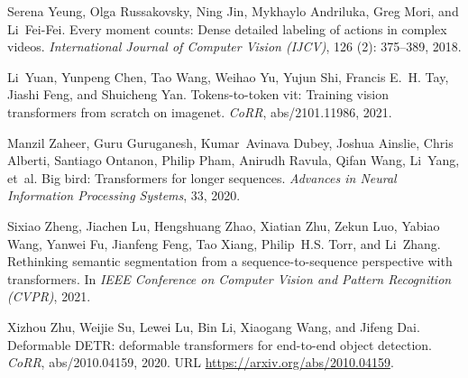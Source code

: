 \documentclass{bmvc2k}
\begin{document}
\begin{thebibliography}{53}
Serena Yeung, Olga Russakovsky, Ning Jin, Mykhaylo Andriluka, Greg Mori, and
  Li~Fei-Fei.
\newblock Every moment counts: Dense detailed labeling of actions in complex
  videos.
\newblock \emph{International Journal of Computer Vision (IJCV)}, 126
  (2): 375--389, 2018.

Li~Yuan, Yunpeng Chen, Tao Wang, Weihao Yu, Yujun Shi, Francis E.~H. Tay,
  Jiashi Feng, and Shuicheng Yan.
\newblock Tokens-to-token vit: Training vision transformers from scratch on
  imagenet.
\newblock \emph{CoRR}, abs/2101.11986, 2021.

Manzil Zaheer, Guru Guruganesh, Kumar~Avinava Dubey, Joshua Ainslie, Chris
  Alberti, Santiago Ontanon, Philip Pham, Anirudh Ravula, Qifan Wang, Li~Yang,
  et~al.
\newblock Big bird: Transformers for longer sequences.
\newblock \emph{Advances in Neural Information Processing Systems}, 33, 2020.

Sixiao Zheng, Jiachen Lu, Hengshuang Zhao, Xiatian Zhu, Zekun Luo, Yabiao Wang,
  Yanwei Fu, Jianfeng Feng, Tao Xiang, Philip~H.S. Torr, and Li~Zhang.
\newblock Rethinking semantic segmentation from a sequence-to-sequence
  perspective with transformers.
\newblock In \emph{IEEE Conference on Computer Vision and Pattern Recognition
  (CVPR)}, 2021.

Xizhou Zhu, Weijie Su, Lewei Lu, Bin Li, Xiaogang Wang, and Jifeng Dai.
\newblock Deformable {DETR:} deformable transformers for end-to-end object
  detection.
\newblock \emph{CoRR}, abs/2010.04159, 2020.
\newblock URL \url{https://arxiv.org/abs/2010.04159}.

\end{thebibliography}
 
\end{document}

